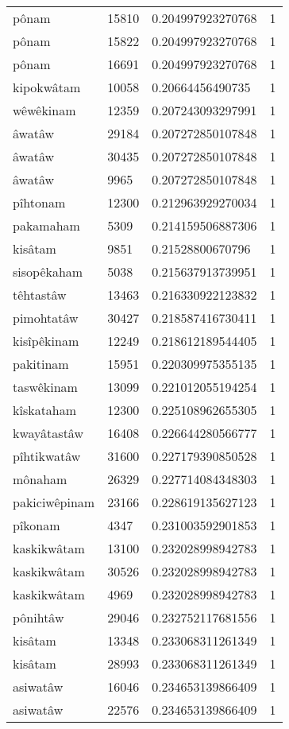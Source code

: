 \begin{longtable}{llll}
pônam & 15810 & 0.204997923270768 & 1 \\
pônam & 15822 & 0.204997923270768 & 1 \\
pônam & 16691 & 0.204997923270768 & 1 \\
kipokwâtam & 10058 & 0.20664456490735 & 1 \\
wêwêkinam & 12359 & 0.207243093297991 & 1 \\
âwatâw & 29184 & 0.207272850107848 & 1 \\
âwatâw & 30435 & 0.207272850107848 & 1 \\
âwatâw & 9965 & 0.207272850107848 & 1 \\
pîhtonam & 12300 & 0.212963929270034 & 1 \\
pakamaham & 5309 & 0.214159506887306 & 1 \\
kisâtam & 9851 & 0.21528800670796 & 1 \\
sisopêkaham & 5038 & 0.215637913739951 & 1 \\
têhtastâw & 13463 & 0.216330922123832 & 1 \\
pimohtatâw & 30427 & 0.218587416730411 & 1 \\
kisîpêkinam & 12249 & 0.218612189544405 & 1 \\
pakitinam & 15951 & 0.220309975355135 & 1 \\
taswêkinam & 13099 & 0.221012055194254 & 1 \\
kîskataham & 12300 & 0.225108962655305 & 1 \\
kwayâtastâw & 16408 & 0.226644280566777 & 1 \\
pîhtikwatâw & 31600 & 0.227179390850528 & 1 \\
mônaham & 26329 & 0.227714084348303 & 1 \\
pakiciwêpinam & 23166 & 0.228619135627123 & 1 \\
pîkonam & 4347 & 0.231003592901853 & 1 \\
kaskikwâtam & 13100 & 0.232028998942783 & 1 \\
kaskikwâtam & 30526 & 0.232028998942783 & 1 \\
kaskikwâtam & 4969 & 0.232028998942783 & 1 \\
pônihtâw & 29046 & 0.232752117681556 & 1 \\
kisâtam & 13348 & 0.233068311261349 & 1 \\
kisâtam & 28993 & 0.233068311261349 & 1 \\
asiwatâw & 16046 & 0.234653139866409 & 1 \\
asiwatâw & 22576 & 0.234653139866409 & 1 \\

\end{longtable}
